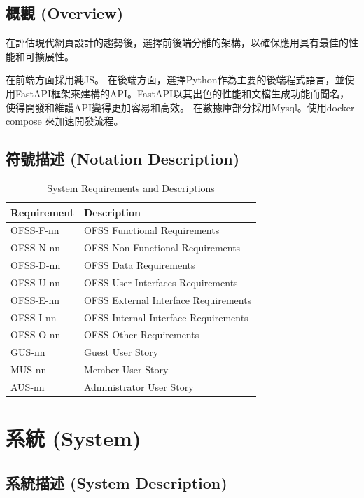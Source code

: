 \documentclass[a4paper, 12pt]{article}
\begin{document}
\subsection{概觀 (Overview)}
在評估現代網頁設計的趨勢後，選擇前後端分離的架構，以確保應用具有最佳的性能和可擴展性。

在前端方面採用純JS。
在後端方面，選擇Python作為主要的後端程式語言，並使用FastAPI框架來建構的API。FastAPI以其出色的性能和文檔生成功能而聞名，使得開發和維護API變得更加容易和高效。
在數據庫部分採用Mysql。使用docker-compose 來加速開發流程。

\subsection{符號描述 (Notation Description)}

\begin{table}[h]
    \centering
    \renewcommand{\arraystretch}{1.35}
    \begin{tabular}{|p{3cm}|p{10cm}|}
        \hline
        \textbf{Requirement} & \textbf{Description} \\
        \hline
        OFSS-F-nn & OFSS Functional Requirements \\
        \hline
        OFSS-N-nn & OFSS Non-Functional Requirements \\
        \hline
        OFSS-D-nn & OFSS Data Requirements \\
        \hline
        OFSS-U-nn & OFSS User Interfaces Requirements \\
        \hline
        OFSS-E-nn & OFSS External Interface Requirements \\
        \hline
        OFSS-I-nn & OFSS Internal Interface Requirements \\
        \hline
        OFSS-O-nn & OFSS Other Requirements \\
        \hline
        GUS-nn & Guest User Story \\
        \hline
        MUS-nn & Member User Story \\
        \hline
        AUS-nn & Administrator User Story \\
        \hline
    \end{tabular}
    \caption{System Requirements and Descriptions}
    \label{tab:system-requirements}
\end{table}
\newpage
\section{系統 (System)}
\subsection{系統描述 (System Description)}
\end{document}
